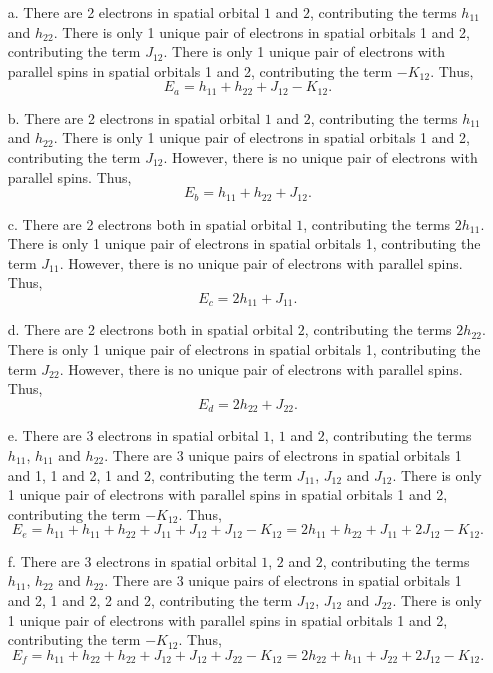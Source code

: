 \documentclass[a4paper]{book}
\newcounter{solution}[chapter]
\begin{document}
	\begin{solution}
	
	\begin{itemize}
	
	\item[a.] There are 2 electrons in spatial orbital $1$ and $2$, contributing the terms $h_{11}$ and $h_{22}$. There is only 1 unique pair of electrons in spatial orbitals 1 and 2, contributing the term $J_{12}$. There is only 1 unique pair of electrons with parallel spins in spatial orbitals 1 and 2, contributing the term $-K_{12}$. Thus,
	\[
		E_a = h_{11} + h_{22} +  J_{12} - K_{12}.
	\]
	
	\item[b.] There are 2 electrons in spatial orbital $1$ and $2$, contributing the terms $h_{11}$ and $h_{22}$. There is only 1 unique pair of electrons in spatial orbitals 1 and 2, contributing the term $J_{12}$. However, there is no unique pair of electrons with parallel spins. Thus,
	\[
		E_b = h_{11} + h_{22} +  J_{12} .
	\]
	
	\item[c.] There are 2 electrons both in spatial orbital $1$, contributing the terms $2h_{11}$. There is only 1 unique pair of electrons in spatial orbitals 1, contributing the term $J_{11}$. However, there is no unique pair of electrons with parallel spins. Thus,
	\[
		E_c = 2h_{11} +  J_{11} .
	\]

	\item[d.] There are 2 electrons both in spatial orbital $2$, contributing the terms $2h_{22}$. There is only 1 unique pair of electrons in spatial orbitals 1, contributing the term $J_{22}$. However, there is no unique pair of electrons with parallel spins. Thus,
	\[
		E_d = 2h_{22} +  J_{22} .
	\]
	
	\item[e.] There are 3 electrons in spatial orbital $1$, $1$ and $2$, contributing the terms $h_{11}$, $h_{11}$  and $h_{22}$. There are 3 unique pairs of electrons in spatial orbitals 1 and 1, 1 and 2, 1 and 2, contributing the term $J_{11}$, $J_{12}$ and $J_{12}$. There is only 1 unique pair of electrons with parallel spins in spatial orbitals 1 and 2, contributing the term $-K_{12}$. Thus,
	\[
		E_e = h_{11} + h_{11} + h_{22} + J_{11} + J_{12} + J_{12} - K_{12} = 2h_{11} + h_{22} +  J_{11} + 2J_{12} - K_{12}.
	\]
	
	\item[f.] There are 3 electrons in spatial orbital $1$, $2$ and $2$, contributing the terms $h_{11}$, $h_{22}$  and $h_{22}$. There are 3 unique pairs of electrons in spatial orbitals 1 and 2, 1 and 2, 2 and 2, contributing the term $J_{12}$, $J_{12}$ and $J_{22}$. There is only 1 unique pair of electrons with parallel spins in spatial orbitals 1 and 2, contributing the term $-K_{12}$. Thus,
	\[
		E_f = h_{11} + h_{22} + h_{22} + J_{12} + J_{12} + J_{22} - K_{12} = 2h_{22} + h_{11} +  J_{22} + 2J_{12} - K_{12} .
	\]
	

\end{itemize}
\end{solution}
\end{document}
